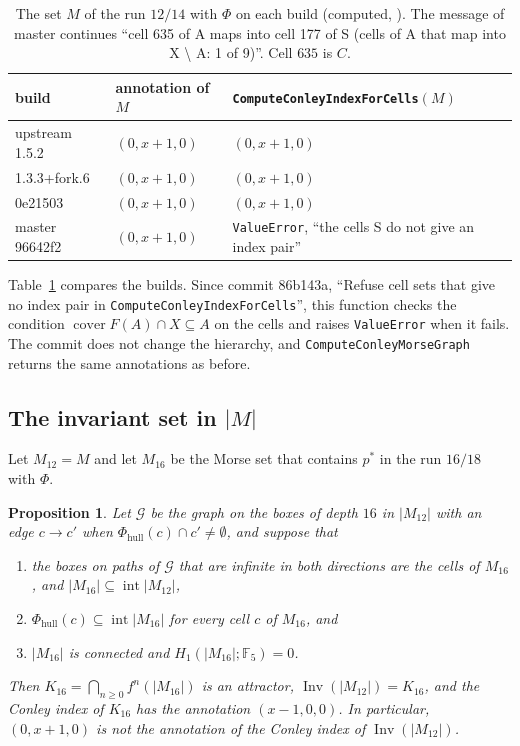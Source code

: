 \documentclass[11pt]{article}
\theoremstyle{plain}
\newtheorem{proposition}{Proposition}[section]
\theoremstyle{definition}
\theoremstyle{remark}
\DeclareMathOperator{\Inv}{Inv}
\DeclareMathOperator{\cover}{cover}
\DeclareMathOperator{\interior}{int}
\newcommand{\F}{\mathbb{F}_5}
\newcommand{\Phihull}{\Phi_{\mathrm{hull}}}
\newcommand{\code}[1]{\texttt{#1}}
\begin{document}
\begin{table}[tbp]
\centering
\caption{The set $M$ of the run $12/14$ with $\Phi$ on each build (computed, ). The message of master continues ``cell 635 of A maps into cell 177 of S (cells of A that map into X \textbackslash{} A: 1 of 9)''. Cell $635$ is $C$.}\label{tab:builds}
\begin{tabular}{lll}
\toprule
build & annotation of $M$ & \code{ComputeConleyIndexForCells}$(M)$ \\
\midrule
upstream 1.5.2 & $(0,x+1,0)$ & $(0,x+1,0)$ \\
1.3.3+fork.6 & $(0,x+1,0)$ & $(0,x+1,0)$ \\
0e21503 & $(0,x+1,0)$ & $(0,x+1,0)$ \\
master 96642f2 & $(0,x+1,0)$ & \code{ValueError}, ``the cells S do not give an index pair'' \\
\bottomrule
\end{tabular}
\end{table}

Table~\ref{tab:builds} compares the builds. Since commit 86b143a, ``Refuse cell sets that give no index pair in \code{ComputeConleyIndexForCells}'', this function checks the condition $\cover F(A)\cap X\subseteq A$ on the cells and raises \code{ValueError} when it fails. The commit does not change the hierarchy, and \code{ComputeConleyMorseGraph} returns the same annotations as before.

\subsection{The invariant set in \texorpdfstring{$|M|$}{|M|}}\label{sec:isolation}

Let $M_{12}=M$ and let $M_{16}$ be the Morse set that contains $p^*$ in the run $16/18$ with $\Phi$.

\begin{proposition}\label{prop:isolation}
Let $\mathcal{G}$ be the graph on the boxes of depth $16$ in $|M_{12}|$ with an edge $c\to c'$ when $\Phihull(c)\cap c'\neq\emptyset$, and suppose that
\begin{enumerate}[label=(\alph*)]
\item the boxes on paths of $\mathcal{G}$ that are infinite in both directions are the cells of $M_{16}$, and $|M_{16}|\subseteq\interior|M_{12}|$,
\item $\Phihull(c)\subseteq\interior|M_{16}|$ for every cell $c$ of $M_{16}$, and
\item $|M_{16}|$ is connected and $H_1(|M_{16}|;\F)=0$.
\end{enumerate}
Then $K_{16}=\bigcap_{n\geq0}f^n(|M_{16}|)$ is an attractor, $\Inv(|M_{12}|)=K_{16}$, and the Conley index of $K_{16}$ has the annotation $(x-1,0,0)$. In particular, $(0,x+1,0)$ is not the annotation of the Conley index of $\Inv(|M_{12}|)$.
\end{proposition}
\end{document}
